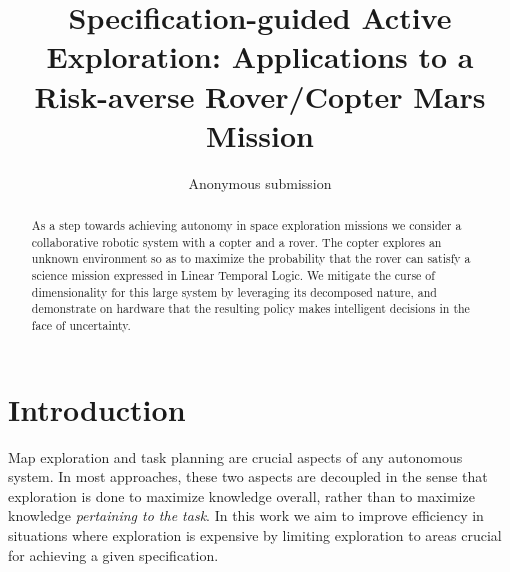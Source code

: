 \documentclass[conference]{IEEEtran}
\begin{document}



\title{\huge Specification-guided Active Exploration: Applications to a Risk-averse Rover/Copter Mars Mission}



\author{Anonymous submission}

\maketitle

\begin{abstract}
  As a step towards achieving autonomy in space exploration missions we consider a collaborative robotic system with a copter and a rover. The copter explores an unknown environment so as to maximize the probability that the rover can satisfy a science mission expressed in Linear Temporal Logic. We mitigate the curse of dimensionality for this large system by leveraging its decomposed nature, and demonstrate on hardware that the resulting policy makes intelligent decisions in the face of uncertainty.
\end{abstract}

\IEEEpeerreviewmaketitle

	

\section{Introduction}

Map exploration and task planning are crucial aspects of any autonomous system. In most approaches, these two aspects are decoupled in the sense that exploration is done to maximize knowledge overall, rather than to maximize knowledge \emph{pertaining to the task}. In this work we aim to improve efficiency in situations where exploration is expensive by limiting exploration to areas crucial for achieving a given specification. 
\end{document}
